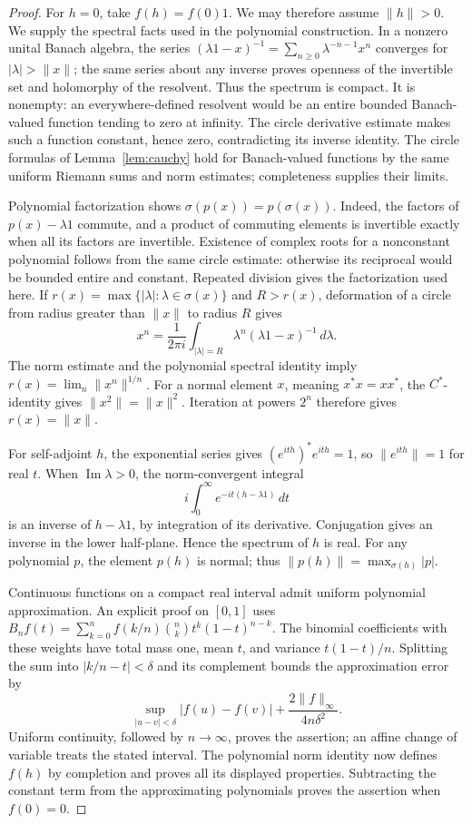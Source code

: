 \documentclass[11pt]{article}
\numberwithin{equation}{section}
\begin{document}
\begin{proof}
For $h=0$, take $f(h)=f(0)1$.  We may therefore assume $\|h\|>0$.
We supply the spectral facts used in the polynomial construction.
In a nonzero unital Banach algebra, the series
$(\lambda1-x)^{-1}=\sum_{n\geq0}\lambda^{-n-1}x^n$ converges for
$|\lambda|>\|x\|$; the same series about any inverse proves openness of the
invertible set and holomorphy of the resolvent.
Thus the spectrum is compact.  It is nonempty: an everywhere-defined
resolvent would be an entire bounded Banach-valued function tending to zero
at infinity.  The circle derivative estimate makes such a function constant,
hence zero, contradicting its inverse identity.
The circle formulas of Lemma~\ref{lem:cauchy} hold for Banach-valued
functions by the same uniform Riemann sums and norm estimates; completeness
supplies their limits.

Polynomial factorization shows $\sigma(p(x))=p(\sigma(x))$.
Indeed, the factors of $p(x)-\lambda1$ commute, and a product of commuting
elements is invertible exactly when all its factors are invertible.
Existence of complex roots for a nonconstant polynomial follows from the
same circle estimate: otherwise its reciprocal would be bounded entire and
constant.  Repeated division gives the factorization used here.
If $r(x)=\max\{|\lambda|:\lambda\in\sigma(x)\}$ and $R>r(x)$, deformation
of a circle from radius greater than $\|x\|$ to radius $R$ gives
\[
 x^n=\frac1{2\pi i}\int_{|\lambda|=R}
           \lambda^n(\lambda1-x)^{-1}\,d\lambda.
\]
The norm estimate and the polynomial spectral identity imply
$r(x)=\lim_n\|x^n\|^{1/n}$.
For a normal element $x$, meaning $x^*x=xx^*$, the $C^*$-identity gives
$\|x^2\|=\|x\|^2$.  Iteration at powers $2^n$ therefore gives
$r(x)=\|x\|$.

For self-adjoint $h$, the exponential series gives
$(e^{ith})^*e^{ith}=1$, so $\|e^{ith}\|=1$ for real $t$.
When $\operatorname{Im}\lambda>0$, the norm-convergent integral
\[
 i\int_0^\infty e^{-it(h-\lambda1)}\,dt
\]
is an inverse of $h-\lambda1$, by integration of its derivative.
Conjugation gives an inverse in the lower half-plane.  Hence the spectrum
of $h$ is real.  For any polynomial $p$, the element $p(h)$ is normal;
thus $\|p(h)\|=\max_{\sigma(h)}|p|$.

Continuous functions on a compact real interval admit uniform polynomial
approximation.  An explicit proof on $[0,1]$ uses
$B_nf(t)=\sum_{k=0}^n f(k/n)\binom nk t^k(1-t)^{n-k}$.
The binomial coefficients with these weights have total mass one, mean
$t$, and variance $t(1-t)/n$.  Splitting the sum into $|k/n-t|<\delta$
and its complement bounds the approximation error by
\[
 \sup_{|u-v|<\delta}|f(u)-f(v)|+
       \frac{2\|f\|_\infty}{4n\delta^2}.
\]
Uniform continuity, followed by $n\to\infty$, proves the assertion;
an affine change of variable treats the stated interval.
The polynomial norm identity now defines $f(h)$ by completion and proves
all its displayed properties.  Subtracting the constant term from the
approximating polynomials proves the assertion when $f(0)=0$.


\end{proof}
\end{document}
